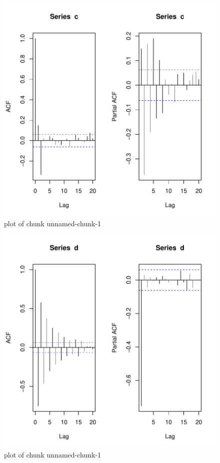 \begin{question}
\begin{figure}[H]
	\centering
	\includegraphics{unnamed-chunk-1-3.pdf}
	\caption{plot of chunk unnamed-chunk-1}
\end{figure}


\begin{figure}[H]
	\centering
	\includegraphics{unnamed-chunk-1-4.pdf}
	\caption{plot of chunk unnamed-chunk-1}
\end{figure}





\end{question}
